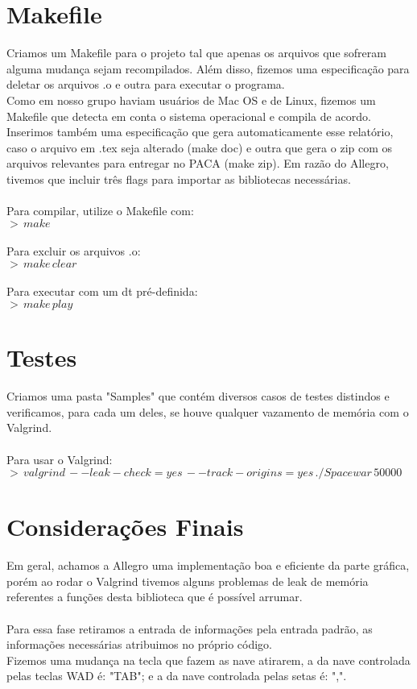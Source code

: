 \documentclass{article}
\begin{document}
\section{Makefile}
Criamos um Makefile para o projeto tal que apenas os arquivos que sofreram alguma mudança sejam recompilados. Além disso, fizemos uma especificação para deletar os arquivos .o e outra para executar o programa. \\
Como em nosso grupo haviam usuários de Mac OS e de Linux, fizemos um Makefile que detecta em conta o sistema operacional e compila de acordo.
Inserimos também uma especificação que gera automaticamente esse relatório, caso o arquivo em .tex seja alterado (make doc) e outra que gera o zip com os arquivos relevantes para entregar no PACA (make zip).
Em razão do Allegro, tivemos que incluir três flags para importar as bibliotecas necessárias. \\ \\
Para compilar, utilize o Makefile com:
\\
\indent $>\,make$ \\ \\
Para excluir os arquivos .o:
\\
\indent $>\,make\,clear$ \\ \\
Para executar com um dt pré-definida:
\\
\indent $>\,make\,play$


\section{Testes}
Criamos uma pasta "Samples" que contém diversos casos de testes distindos e verificamos, para cada um deles, se houve qualquer vazamento de memória com o Valgrind. \\ \\
Para usar o Valgrind:
\\
\indent $>\,valgrind\,--leak-check=yes\,--track-origins=yes\,./Spacewar\,50000$

\section{Considerações Finais}
Em geral, achamos a Allegro uma implementação boa e eficiente da parte gráfica, porém ao rodar o Valgrind tivemos alguns problemas de leak de memória referentes a
funções desta biblioteca que é possível arrumar. \\
\\
Para essa fase retiramos a entrada de informações pela entrada padrão, as informações necessárias atribuimos no próprio código.
\\
Fizemos uma mudança na tecla que fazem as nave atirarem, a da nave controlada pelas teclas WAD é: "TAB"; e a da nave controlada pelas setas é: ",".
\end{document}
